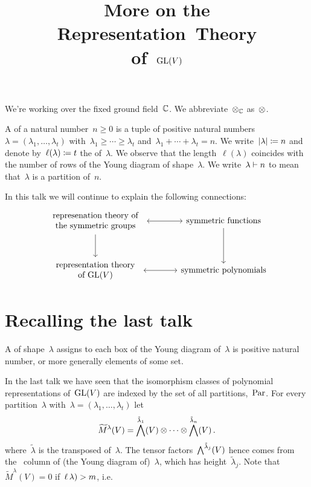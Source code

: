 \documentclass[a4paper,10pt]{scrartcl}
\title{More on the \\ Representation~Theory \\ of~$\operatorname{GL}(V)$}
\author{}
\date{}
\begin{document}
\maketitle

\vspace{-4em}

We’re working over the fixed ground field~$\mathbb{C}$.
We abbreviate~$\otimes_{\mathbb{C}}$ as~$\otimes$.

A  of a natural number~$n \geq 0$ is a tuple of positive natural numbers~$\lambda = (\lambda_1, \dotsc, \lambda_t)$ with~$\lambda_1 \geq \dotsb \geq \lambda_t$ and~$\lambda_1 + \dotsb + \lambda_t = n$.
We write~$\lvert\lambda\rvert \coloneqq n$ and denote by~$\operatorname{\ell}(\lambda) \coloneqq t$ the  of~$\lambda$.
We observe that the length~$\ell(\lambda)$ coincides with the number of rows of the Young diagram of shape~$\lambda$.
We write~$\lambda \vdash n$ to mean that~$\lambda$ is a partition of~$n$.

In this talk we will continue to explain the following connections:
\[
  \begin{tikzcd}[sep = large]
    \begin{tabular}{c}
      represenation theory of \\
      the symmetric groups
    \end{tabular}
    \arrow[leftrightarrow]{r}
    \arrow{d}
    &
    \text{symmetric functions}
    \arrow{d}
    \\
    \begin{tabular}{c}
      representation theory \\
      of~$\GL(V)$
    \end{tabular}
    \arrow[leftrightarrow]{r}
    &
    \text{symmetric polynomials}
  \end{tikzcd}
\]


\section{Recalling the last talk}

A  of shape~$\lambda$ assigns to each box of the Young diagram of~$\lambda$ is positive natural number, or more generally elements of some set.

In the last talk we have seen that the isomorphism classes of polynomial representations of~$\operatorname{GL}(V)$ are indexed by the set of all partitions,~$\operatorname{Par}$.
For every partition~$\lambda$ with~$\lambda = (\lambda_1, \dotsc, \lambda_t)$ let
\[
  \widetilde{M}^\lambda(V)
  =
  \bigwedge^{\tilde{\lambda}_1}(V) \otimes \dotsb \otimes \bigwedge^{\tilde{\lambda}_n}(V) \,.
\]
where~$\tilde{\lambda}$ is the transposed of~$\lambda$.
The tensor factors~$\bigwedge^{\tilde{\lambda}_j}(V)$ hence comes from the~{} column of (the Young diagram of)~$\lambda$, which has height~$\tilde{\lambda}_j$.
Note that~$\widetilde{M}^\lambda(V) = 0$ if~$\operatorname{\ell}\lambda) > m$, i.e.\
\end{document}
